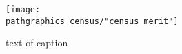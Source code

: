 \begin{figure}[t]
  \texttt{[image: \\pathgraphics census/"census merit"]}
  	\caption{text of caption}
\end{figure}

\endinput  %

